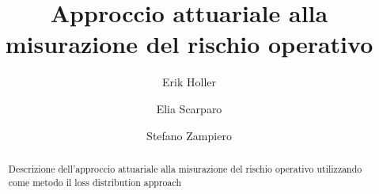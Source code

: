 \documentclass[a4paper,11pt]{article}
\begin{document}
\begin{frontespizio}
\end{frontespizio}
\author{Erik Holler \and Elia Scarparo \and Stefano Zampiero}
\title{Approccio attuariale alla misurazione del rischio operativo}

\maketitle
\begin{abstract}
Descrizione dell'approccio attuariale alla misurazione del rischio operativo utilizzando come metodo il loss distribution approach
\end{abstract}
\tableofcontents
\end{document}

